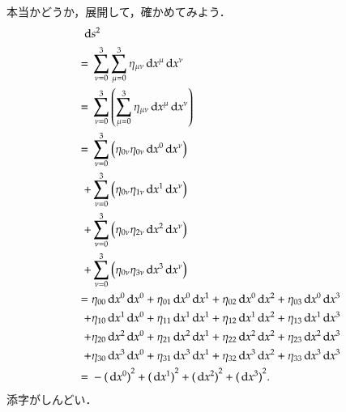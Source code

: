    本当かどうか，展開して，確かめてみよう．
    \begin{align*}
        \,\mathrm{d} &{s}^{2} \\
        =\;&\sum_{\nu=0}^{3} \sum_{\mu=0}^{3} \eta_{\mu\nu} \,\mathrm{d} x^{\mu} \,\mathrm{d} x^{\nu} \\
        =\;&\sum_{\nu=0}^{3} \left( \sum_{\mu=0}^{3} \eta_{\mu\nu} \,\mathrm{d} x^{\mu} \,\mathrm{d} x^{\nu} \right) \\
        =\;&\sum_{\nu=0}^{3} \left( \eta_{0\nu} \eta_{0\nu} \,\mathrm{d} x^{0} \,\mathrm{d} x^{\nu} \right) \\
        \;+&\sum_{\nu=0}^{3} \left( \eta_{0\nu} \eta_{1\nu} \,\mathrm{d} x^{1} \,\mathrm{d} x^{\nu} \right) \\
        \;+&\sum_{\nu=0}^{3} \left( \eta_{0\nu} \eta_{2\nu} \,\mathrm{d} x^{2} \,\mathrm{d} x^{\nu} \right) \\
        \;+&\sum_{\nu=0}^{3} \left( \eta_{0\nu} \eta_{3\nu} \,\mathrm{d} x^{3} \,\mathrm{d} x^{\nu} \right) \\
        =\;&\eta_{00} \,\mathrm{d} x^{0} \,\mathrm{d} x^{0} + \eta_{01} \,\mathrm{d} x^{0} \,\mathrm{d} x^{1} + \eta_{02} \,\mathrm{d} x^{0} \,\mathrm{d} x^{2} + \eta_{03} \,\mathrm{d} x^{0} \,\mathrm{d} x^{3} \\
        \;+&\eta_{10} \,\mathrm{d} x^{1} \,\mathrm{d} x^{0} + \eta_{11} \,\mathrm{d} x^{1} \,\mathrm{d} x^{1} + \eta_{12} \,\mathrm{d} x^{1} \,\mathrm{d} x^{2} + \eta_{13} \,\mathrm{d} x^{1} \,\mathrm{d} x^{3} \\
        \;+&\eta_{20} \,\mathrm{d} x^{2} \,\mathrm{d} x^{0} + \eta_{21} \,\mathrm{d} x^{2} \,\mathrm{d} x^{1} + \eta_{22} \,\mathrm{d} x^{2} \,\mathrm{d} x^{2} + \eta_{23} \,\mathrm{d} x^{2} \,\mathrm{d} x^{3} \\
        \;+&\eta_{30} \,\mathrm{d} x^{3} \,\mathrm{d} x^{0} + \eta_{31} \,\mathrm{d} x^{3} \,\mathrm{d} x^{1} + \eta_{32} \,\mathrm{d} x^{3} \,\mathrm{d} x^{2} + \eta_{33} \,\mathrm{d} x^{3} \,\mathrm{d} x^{3} \\
        =\;&-{(\,\mathrm{d} x^{0})}^{2} + {(\,\mathrm{d} x^{1})}^{2} + {(\,\mathrm{d} x^{2})}^{2} + {(\,\mathrm{d} x^{3})}^{2}.
    \end{align*}
    添字がしんどい．

